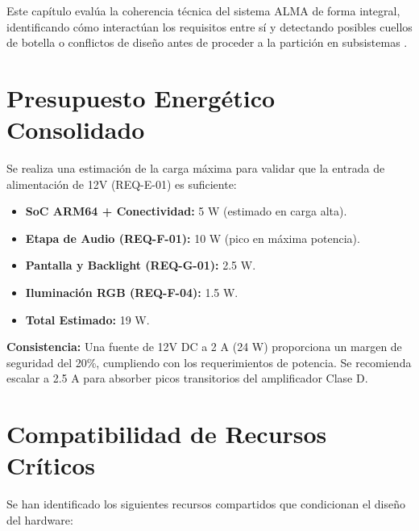 \documentclass[%
	paper=a4,
	twoside=false,
	parskip=half,
	chapterprefix=false,
	10pt,
	headings=normal,
	bibliography=totoc,
	listof=totoc,
	titlepage=on,
	captions=tableabove,
	draft=false, 
]{scrbook}%
\begin{document}
Este capítulo evalúa la coherencia técnica del sistema ALMA de forma integral, identificando cómo interactúan los requisitos entre sí y detectando posibles cuellos de botella o conflictos de diseño antes de proceder a la partición en subsistemas \cite{guia_entregable2}.

\section{Presupuesto Energético Consolidado}

Se realiza una estimación de la carga máxima para validar que la entrada de alimentación de 12V (REQ-E-01) es suficiente:

\begin{itemize}
    \item \textbf{SoC ARM64 + Conectividad:} 5 W (estimado en carga alta).
    \item \textbf{Etapa de Audio (REQ-F-01):} 10 W (pico en máxima potencia).
    \item \textbf{Pantalla y Backlight (REQ-G-01):} 2.5 W.
    \item \textbf{Iluminación RGB (REQ-F-04):} 1.5 W.
    \item \textbf{Total Estimado:} 19 W.
\end{itemize}

\textbf{Consistencia:} Una fuente de 12V DC a 2 A (24 W) proporciona un margen de seguridad del 20\%, cumpliendo con los requerimientos de potencia. Se recomienda escalar a 2.5 A para absorber picos transitorios del amplificador Clase D.

\section{Compatibilidad de Recursos Críticos}

Se han identificado los siguientes recursos compartidos que condicionan el diseño del hardware:
\end{document}
